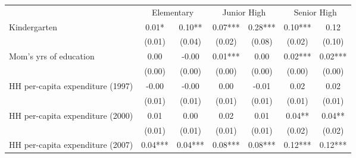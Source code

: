 \begin{tabular}{lllllll}
\cline{1-7}
\multicolumn{1}{c}{} &
  \multicolumn{2}{c}{Elementary} &
  \multicolumn{2}{c}{Junior High} &
  \multicolumn{2}{c}{Senior High} \\
\cline{1-7}
\multicolumn{1}{l}{Kindergarten} &
  \multicolumn{1}{c}{0.01* } &
  \multicolumn{1}{c}{0.10** } &
  \multicolumn{1}{c}{0.07***} &
  \multicolumn{1}{c}{0.28***} &
  \multicolumn{1}{c}{0.10***} &
  \multicolumn{1}{c}{0.12 } \\
\multicolumn{1}{l}{} &
  \multicolumn{1}{c}{(0.01)} &
  \multicolumn{1}{c}{(0.04)} &
  \multicolumn{1}{c}{(0.02)} &
  \multicolumn{1}{c}{(0.08)} &
  \multicolumn{1}{c}{(0.02)} &
  \multicolumn{1}{c}{(0.10)} \\
\multicolumn{1}{l}{Mom's yrs of education} &
  \multicolumn{1}{c}{0.00 } &
  \multicolumn{1}{c}{-0.00 } &
  \multicolumn{1}{c}{0.01***} &
  \multicolumn{1}{c}{0.00 } &
  \multicolumn{1}{c}{0.02***} &
  \multicolumn{1}{c}{0.02***} \\
\multicolumn{1}{l}{} &
  \multicolumn{1}{c}{(0.00)} &
  \multicolumn{1}{c}{(0.00)} &
  \multicolumn{1}{c}{(0.00)} &
  \multicolumn{1}{c}{(0.00)} &
  \multicolumn{1}{c}{(0.00)} &
  \multicolumn{1}{c}{(0.00)} \\
\multicolumn{1}{l}{HH per-capita expenditure (1997)} &
  \multicolumn{1}{c}{-0.00 } &
  \multicolumn{1}{c}{-0.00 } &
  \multicolumn{1}{c}{0.00 } &
  \multicolumn{1}{c}{-0.01 } &
  \multicolumn{1}{c}{0.02 } &
  \multicolumn{1}{c}{0.02 } \\
\multicolumn{1}{l}{} &
  \multicolumn{1}{c}{(0.01)} &
  \multicolumn{1}{c}{(0.01)} &
  \multicolumn{1}{c}{(0.01)} &
  \multicolumn{1}{c}{(0.01)} &
  \multicolumn{1}{c}{(0.01)} &
  \multicolumn{1}{c}{(0.01)} \\
\multicolumn{1}{l}{HH per-capita expenditure (2000)} &
  \multicolumn{1}{c}{0.01 } &
  \multicolumn{1}{c}{0.00 } &
  \multicolumn{1}{c}{0.02 } &
  \multicolumn{1}{c}{0.01 } &
  \multicolumn{1}{c}{0.04** } &
  \multicolumn{1}{c}{0.04** } \\
\multicolumn{1}{l}{} &
  \multicolumn{1}{c}{(0.01)} &
  \multicolumn{1}{c}{(0.01)} &
  \multicolumn{1}{c}{(0.01)} &
  \multicolumn{1}{c}{(0.01)} &
  \multicolumn{1}{c}{(0.02)} &
  \multicolumn{1}{c}{(0.02)} \\
\multicolumn{1}{l}{HH per-capita expenditure (2007)} &
  \multicolumn{1}{c}{0.04***} &
  \multicolumn{1}{c}{0.04***} &
  \multicolumn{1}{c}{0.08***} &
  \multicolumn{1}{c}{0.08***} &
  \multicolumn{1}{c}{0.12***} &
  \multicolumn{1}{c}{0.12***} \\

\end{tabular}
